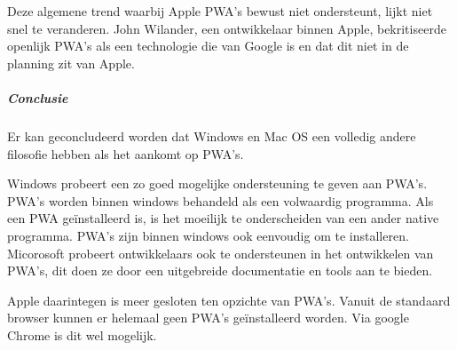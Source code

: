 	Deze algemene trend waarbij Apple PWA's bewust niet ondersteunt, lijkt niet snel te veranderen. John Wilander, een ontwikkelaar binnen Apple, bekritiseerde openlijk PWA's als een technologie die van Google is en dat dit niet in de planning zit van Apple. 
	\autocite{Wilander2019}
	
	
	\subparagraph{Conclusie}
	Er kan geconcludeerd worden dat Windows en Mac OS een volledig andere filosofie hebben als het aankomt op PWA's. 
	
	Windows probeert een zo goed mogelijke ondersteuning te geven aan PWA's. PWA's worden binnen windows behandeld als een volwaardig programma. Als een PWA geïnstalleerd is, is het moeilijk te onderscheiden van een ander native programma.
	PWA's zijn binnen windows ook eenvoudig om te installeren.
	Micorosoft probeert ontwikkelaars ook te ondersteunen in het ontwikkelen van PWA's, dit doen ze door een uitgebreide documentatie en tools aan te bieden.
	
	Apple daarintegen is meer gesloten ten opzichte van PWA's. Vanuit de standaard browser kunnen er helemaal geen PWA's geïnstalleerd worden. Via google Chrome is dit wel mogelijk.
	
